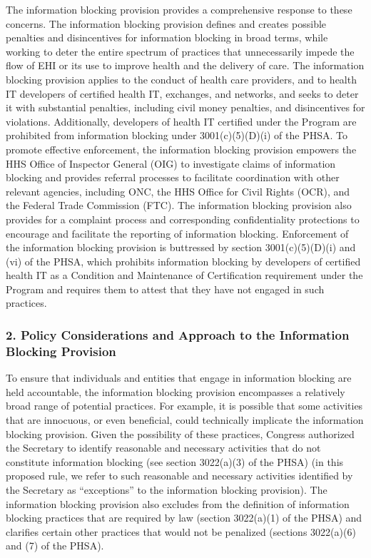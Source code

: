 \documentclass[twoside,11pt]{article}
\begin{document}
          The information blocking provision provides a comprehensive response to these concerns. The information blocking provision defines and creates possible penalties and disincentives for  \ifhmode\expandafter\xspace\fi information blocking in broad terms, while working to deter the entire spectrum of practices that unnecessarily impede the flow of EHI or its use to improve health and the delivery of care. The information blocking provision applies to the conduct of health care providers, and to health IT developers of certified health IT, exchanges, and networks, and seeks to deter it with substantial penalties, including civil money penalties, and disincentives for violations. Additionally, developers of health IT certified under the Program are prohibited from information blocking under 3001(c)(5)(D)(i) of the PHSA. To promote effective enforcement, the information blocking provision empowers the HHS Office of Inspector General (OIG) to investigate claims of information blocking and provides referral processes to facilitate coordination with other relevant agencies, including ONC, the HHS Office for Civil Rights (OCR), and the Federal Trade Commission (FTC). The information blocking provision also provides for a complaint process and corresponding confidentiality protections to encourage and facilitate the reporting of information blocking. Enforcement of the information blocking provision is buttressed by section 3001(c)(5)(D)(i) and (vi) of the PHSA, which prohibits information blocking by developers of certified health IT as a Condition and Maintenance of Certification requirement under the Program and requires them to attest that they have not engaged in such practices.


          \subsubsection{2. Policy Considerations and Approach to the Information Blocking Provision}

          To ensure that individuals and entities that engage in information blocking are held accountable, the information blocking provision encompasses a relatively broad range of potential practices. For example, it is possible that some activities that are innocuous, or even beneficial, could technically implicate the information blocking provision. Given the possibility of these practices, Congress authorized the Secretary to identify reasonable and necessary activities that do not constitute information blocking (see section 3022(a)(3) of the PHSA) (in this proposed rule, we refer to such reasonable and necessary activities identified by the Secretary as “exceptions” to the information blocking provision). The information blocking provision also excludes from the definition of information blocking practices that are required by law (section 3022(a)(1) of the PHSA) and clarifies certain other practices that would not be penalized (sections 3022(a)(6) and (7) of the PHSA).
\end{document}
